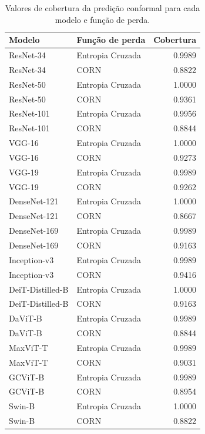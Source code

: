 \begin{table}[ht]
    \centering
    \begin{tabular}{llr}
        \toprule
        \textbf{Modelo} & \textbf{Função de perda} & \textbf{Cobertura} \\
        \midrule
            ResNet-34 & Entropia Cruzada &    0.9989 \\
            ResNet-34 & CORN &    0.8822 \\
            ResNet-50 & Entropia Cruzada &    1.0000 \\
            ResNet-50 & CORN &    0.9361 \\
            ResNet-101 & Entropia Cruzada &    0.9956 \\
            ResNet-101 & CORN &    0.8844 \\
            VGG-16 & Entropia Cruzada &    1.0000 \\
            VGG-16 & CORN &    0.9273 \\
            VGG-19 & Entropia Cruzada &    0.9989 \\
            VGG-19 & CORN &    0.9262 \\
            DenseNet-121 & Entropia Cruzada &    1.0000 \\
            DenseNet-121 & CORN &    0.8667 \\
            DenseNet-169 & Entropia Cruzada &    0.9989 \\
            DenseNet-169 & CORN &    0.9163 \\
            Inception-v3 & Entropia Cruzada &    0.9989 \\
            Inception-v3 & CORN &    0.9416 \\
            DeiT-Distilled-B & Entropia Cruzada &    1.0000 \\
            DeiT-Distilled-B & CORN &    0.9163 \\
            DaViT-B & Entropia Cruzada &    0.9989 \\
            DaViT-B & CORN &    0.8844 \\
            MaxViT-T & Entropia Cruzada &    0.9989 \\
            MaxViT-T & CORN &    0.9031 \\
            GCViT-B & Entropia Cruzada &    0.9989 \\
            GCViT-B & CORN &    0.8954 \\
            Swin-B & Entropia Cruzada &    1.0000 \\
            Swin-B & CORN &    0.8822 \\
    \bottomrule
    \end{tabular}
    \caption{Valores de cobertura da predição conformal para cada modelo e função de perda.}
    \label{tab:conformal_coverage}
\end{table}

